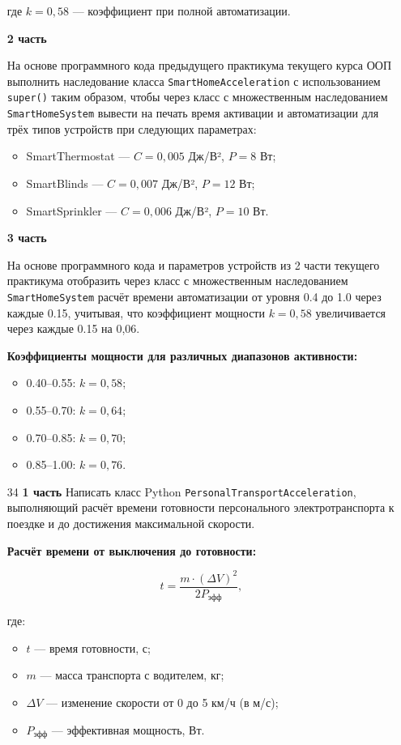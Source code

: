 \begin{enumerate}
где $k = 0{,}58$ — коэффициент при полной автоматизации.

\textbf{2 часть}

На основе программного кода предыдущего практикума текущего курса ООП выполнить наследование класса \texttt{SmartHomeAcceleration} с использованием \texttt{super()} таким образом, чтобы через класс с множественным наследованием \texttt{SmartHomeSystem} вывести на печать время активации и автоматизации для трёх типов устройств при следующих параметрах:

\begin{itemize}
    \item SmartThermostat — $C = 0{,}005$ Дж/В², $P = 8$ Вт;  
    \item SmartBlinds — $C = 0{,}007$ Дж/В², $P = 12$ Вт;  
    \item SmartSprinkler — $C = 0{,}006$ Дж/В², $P = 10$ Вт.  
\end{itemize}

\textbf{3 часть}

На основе программного кода и параметров устройств из 2 части текущего практикума отобразить через класс с множественным наследованием \texttt{SmartHomeSystem} расчёт времени автоматизации от уровня 0.4 до 1.0 через каждые 0.15, учитывая, что коэффициент мощности $k = 0{,}58$ увеличивается через каждые 0.15 на 0{,}06.

\textbf{Коэффициенты мощности для различных диапазонов активности:}
\begin{itemize}
    \item 0.40–0.55: $k = 0{,}58$;  
    \item 0.55–0.70: $k = 0{,}64$;  
    \item 0.70–0.85: $k = 0{,}70$;  
    \item 0.85–1.00: $k = 0{,}76$.  
\end{itemize}


\item[34] \textbf{1 часть}  
Написать класс Python \texttt{PersonalTransportAcceleration}, выполняющий расчёт времени готовности персонального электротранспорта к поездке и до достижения максимальной скорости.

\textbf{Расчёт времени от выключения до готовности:}

\begin{equation}
t = \frac{m \cdot (\Delta V)^2}{2P_{\text{эфф}}},
\end{equation}

где:  
\begin{itemize}
    \item $t$ — время готовности, с;  
    \item $m$ — масса транспорта с водителем, кг;  
    \item $\Delta V$ — изменение скорости от 0 до 5 км/ч (в м/с);  
    \item $P_{\text{эфф}}$ — эффективная мощность, Вт.  
\end{itemize}


\end{enumerate}
